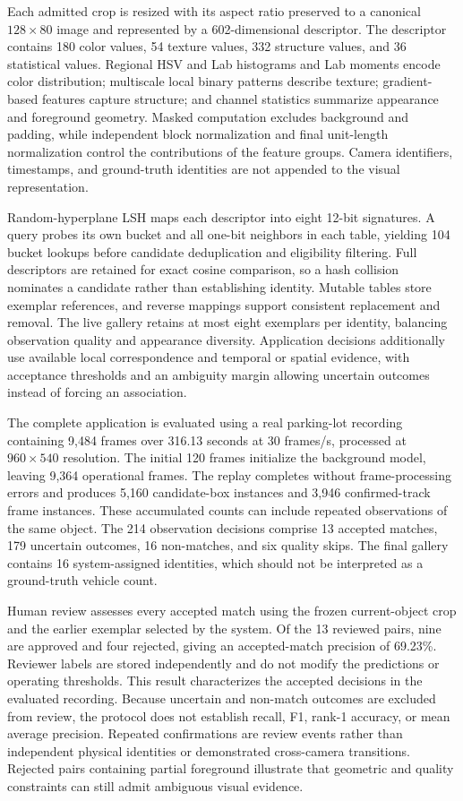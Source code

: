 \documentclass[11pt,a4paper]{article}
\begin{document}
Each admitted crop is resized with its aspect ratio preserved to a canonical $128\times80$ image and represented by a 602-dimensional descriptor. The descriptor contains 180 color values, 54 texture values, 332 structure values, and 36 statistical values. Regional HSV and Lab histograms and Lab moments encode color distribution; multiscale local binary patterns describe texture; gradient-based features capture structure; and channel statistics summarize appearance and foreground geometry. Masked computation excludes background and padding, while independent block normalization and final unit-length normalization control the contributions of the feature groups. Camera identifiers, timestamps, and ground-truth identities are not appended to the visual representation.

Random-hyperplane LSH maps each descriptor into eight 12-bit signatures. A query probes its own bucket and all one-bit neighbors in each table, yielding 104 bucket lookups before candidate deduplication and eligibility filtering. Full descriptors are retained for exact cosine comparison, so a hash collision nominates a candidate rather than establishing identity. Mutable tables store exemplar references, and reverse mappings support consistent replacement and removal. The live gallery retains at most eight exemplars per identity, balancing observation quality and appearance diversity. Application decisions additionally use available local correspondence and temporal or spatial evidence, with acceptance thresholds and an ambiguity margin allowing uncertain outcomes instead of forcing an association.

\newpage

The complete application is evaluated using a real parking-lot recording containing 9,484 frames over 316.13 seconds at 30 frames/s, processed at $960\times540$ resolution. The initial 120 frames initialize the background model, leaving 9,364 operational frames. The replay completes without frame-processing errors and produces 5,160 candidate-box instances and 3,946 confirmed-track frame instances. These accumulated counts can include repeated observations of the same object. The 214 observation decisions comprise 13 accepted matches, 179 uncertain outcomes, 16 non-matches, and six quality skips. The final gallery contains 16 system-assigned identities, which should not be interpreted as a ground-truth vehicle count.

Human review assesses every accepted match using the frozen current-object crop and the earlier exemplar selected by the system. Of the 13 reviewed pairs, nine are approved and four rejected, giving an accepted-match precision of 69.23\%. Reviewer labels are stored independently and do not modify the predictions or operating thresholds. This result characterizes the accepted decisions in the evaluated recording. Because uncertain and non-match outcomes are excluded from review, the protocol does not establish recall, F1, rank-1 accuracy, or mean average precision. Repeated confirmations are review events rather than independent physical identities or demonstrated cross-camera transitions. Rejected pairs containing partial foreground illustrate that geometric and quality constraints can still admit ambiguous visual evidence.
\end{document}
